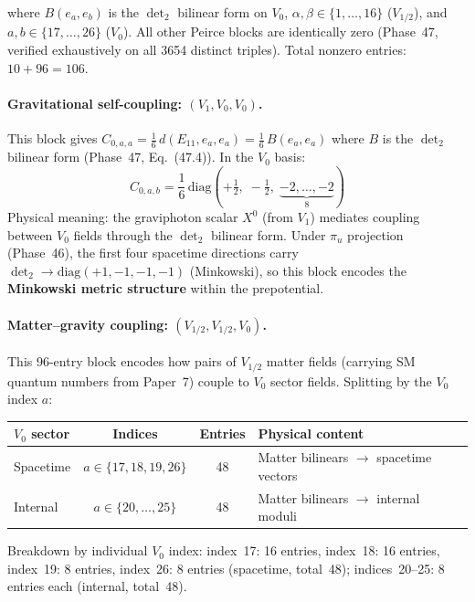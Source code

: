 \noindent
where $B(e_a, e_b)$ is the $\det_2$ bilinear form on $V_0$,
$\alpha, \beta \in \{1,\ldots,16\}$ ($V_{1/2}$), and
$a, b \in \{17,\ldots,26\}$ ($V_0$).
All other Peirce blocks are identically zero (Phase~47, verified
exhaustively on all 3654 distinct triples).
Total nonzero entries: $10 + 96 = 106$.

\paragraph{Gravitational self-coupling: $(V_1, V_0, V_0)$.}
This block gives $C_{0,a,a} = \frac{1}{6}\, d(E_{11}, e_a, e_a)
= \frac{1}{6}\, B(e_a, e_a)$ where $B$ is the $\det_2$ bilinear form
(Phase~47, Eq.~(47.4)). In the $V_0$ basis:
\begin{equation}\tag{49.4}
  C_{0,a,b} = \frac{1}{6}\, \mathrm{diag}\!\left(
    +\tfrac{1}{2},\; -\tfrac{1}{2},\;
    \underbrace{-2, \ldots, -2}_{8}
  \right)
\end{equation}
Physical meaning: the graviphoton scalar $X^0$ (from $V_1$) mediates
coupling between $V_0$ fields through the $\det_2$ bilinear form.
Under $\pi_u$ projection (Phase~46), the first four spacetime
directions carry $\det_2 \to \mathrm{diag}(+1, -1, -1, -1)$
(Minkowski), so this block encodes the
\textbf{Minkowski metric structure} within the prepotential.

\paragraph{Matter--gravity coupling: $(V_{1/2}, V_{1/2}, V_0)$.}
This 96-entry block encodes how pairs of $V_{1/2}$ matter fields
(carrying SM quantum numbers from Paper~7) couple to $V_0$ sector fields.
Splitting by the $V_0$ index $a$:

\begin{center}
\begin{tabular}{l|c|c|l}
\hline
\textbf{$V_0$ sector} & \textbf{Indices} & \textbf{Entries} & \textbf{Physical content} \\
\hline
Spacetime & $a \in \{17, 18, 19, 26\}$ & 48 &
  Matter bilinears $\to$ spacetime vectors \\
\hline
Internal & $a \in \{20, \ldots, 25\}$ & 48 &
  Matter bilinears $\to$ internal moduli \\
\hline
\end{tabular}
\end{center}

\noindent
Breakdown by individual $V_0$ index:
index~17: 16 entries, index~18: 16 entries,
index~19: 8 entries, index~26: 8 entries (spacetime, total~48);
indices~20--25: 8 entries each (internal, total~48).

